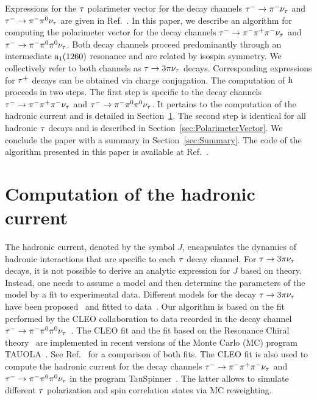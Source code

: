 Expressions for the $\tau$ polarimeter vector for the decay channels $\tau^{-} \to \pi^{-}\nu_{\tau}$ and $\tau^{-} \to \pi^{-}\pi^{\textrm{0}}\nu_{\tau}$ are given in Ref.~\cite{Jadach:1990mz}. 
In this paper, we describe an algorithm for computing the polarimeter vector for the decay channels $\tau^{-} \to \pi^{-}\pi^{+}\pi^{-}\nu_{\tau}$ and $\tau^{-} \to \pi^{-}\pi^{\textrm{0}}\pi^{\textrm{0}}\nu_{\tau}$. Both decay channels proceed predominantly through an intermediate $\textrm{a}_{1}\textrm{(1260)}$ resonance and are related by isospin symmetry.
We collectively refer to both channels as $\tau \to 3 \pi\nu_{\tau}$ decays.
Corresponding expressions for $\tau^{+}$ decays can be obtained via charge conjugation.
The computation of $\textrm{h}$ proceeds in two steps. The first step is specific to the decay channels $\tau^{-} \to \pi^{-}\pi^{+}\pi^{-}\nu_{\tau}$ and $\tau^{-} \to \pi^{-}\pi^{\textrm{0}}\pi^{\textrm{0}}\nu_{\tau}$. It pertains to the computation of the hadronic current and is detailed in Section~\ref{sec:HadronicCurrent}.
The second step is identical for all hadronic $\tau$ decays and is described in Section~\ref{sec:PolarimeterVector}.
We conclude the paper with a summary in Section~\ref{sec:Summary}.
\ifx\ver\verPreprint
The code of the algorithm presented in this paper is available at Ref.~\cite{christian_veelken_2023_8113344}.
\fi

\section{Computation of the hadronic current}
\label{sec:HadronicCurrent}

The hadronic current, denoted by the symbol $J$, encapsulates the dynamics of hadronic interactions that are specific to each $\tau$ decay channel.
For $\tau \to 3 \pi\nu_{\tau}$ decays,
it is not possible to derive an analytic expression for $J$ based on theory.
Instead, one needs to assume a model and then determine the parameters of the model by a fit to experimental data.
Different models for the decay $\tau \to 3 \pi\nu_{\tau}$ have been proposed~\cite{Bowler:1988kf,Isgur:1988vm,Kuhn:1990ad,Feindt:1990ev,Kuhn:1992nz,GomezDumm:2003ku,Dumm:2009va} and fitted to data~\cite{ARGUS:1992olh,OPAL:1997was,DELPHI:1998bhv,Shekhovtsova:2012ra,Nugent:2013hxa}.
Our algorithm is based on the fit performed by the CLEO collaboration to data recorded in the decay channel $\tau^{-} \to \pi^{-}\pi^{\textrm{0}}\pi^{\textrm{0}}\nu_{\tau}$~\cite{CLEO:1999rzk}.
The CLEO fit and the fit based on the Resonance Chiral theory~\cite{GomezDumm:2003ku,Dumm:2009va,Ecker:1988te,Ecker:1989yg} are implemented in recent versions of the Monte Carlo (MC) program \textsc{TAUOLA}~\cite{Jadach:1990mz,Shekhovtsova:2012ra,Nugent:2013hxa}. See Ref.~\cite{Was:2015laa} for a comparison of both fits. The CLEO fit is also used to compute the hadronic current for the decay channels $\tau^{-} \to \pi^{-}\pi^{+}\pi^{-}\nu_{\tau}$ and $\tau^{-} \to \pi^{-}\pi^{\textrm{0}}\pi^{\textrm{0}}\nu_{\tau}$ in the program TauSpinner~\cite{Czyczula:2012ny}. The latter allows to simulate different $\tau$ polarization and spin correlation states via MC reweighting.


